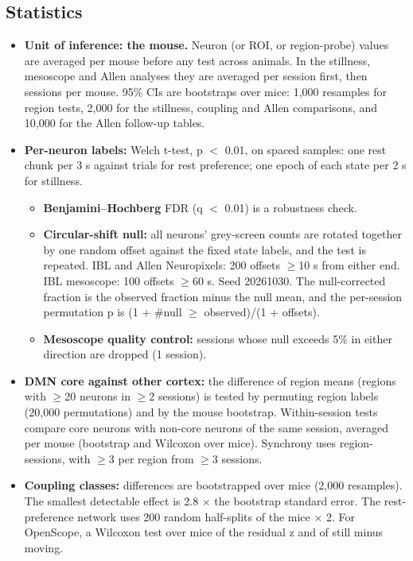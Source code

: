 \documentclass[10pt,a4paper]{article}
\begin{document}
\subsection{Statistics}
\begin{itemize}
\item \textbf{Unit of inference: the mouse.} Neuron (or ROI, or region-probe) values are averaged per mouse before any test across animals. In the stillness, mesoscope and Allen analyses they are averaged per session first, then sessions per mouse. 95\% CIs are bootstraps over mice: 1,000 resamples for region tests, 2,000 for the stillness, coupling and Allen comparisons, and 10,000 for the Allen follow-up tables.
\item \textbf{Per-neuron labels:} Welch t-test, p $<$ 0.01, on spaced samples: one rest chunk per 3 s against trials for rest preference; one epoch of each state per 2 s for stillness. 
\begin{itemize}
\item \textbf{Benjamini--Hochberg} FDR (q $<$ 0.01) is a robustness check.
\item \textbf{Circular-shift null:} all neurons' grey-screen counts are rotated together by one random offset against the fixed state labels, and the test is repeated. IBL and Allen Neuropixels: 200 offsets $\geq$10 s from either end. IBL mesoscope: 100 offsets $\geq$60 s. Seed 20261030. The null-corrected fraction is the observed fraction minus the null mean, and the per-session permutation p is (1 + \#null $\geq$ observed)/(1 + offsets).
\item \textbf{Mesoscope quality control:} sessions whose null exceeds 5\% in either direction are dropped (1 session).
\end{itemize}
\item \textbf{DMN core against other cortex:} the difference of region means (regions with $\geq$20 neurons in $\geq$2 sessions) is tested by permuting region labels (20,000 permutations) and by the mouse bootstrap. Within-session tests compare core neurons with non-core neurons of the same session, averaged per mouse (bootstrap and Wilcoxon over mice). Synchrony uses region-sessions, with $\geq$3 per region from $\geq$3 sessions.
\item \textbf{Coupling classes:} differences are bootstrapped over mice (2,000 resamples). The smallest detectable effect is 2.8 $\times$ the bootstrap standard error. The rest-preference network uses 200 random half-splits of the mice $\times$ 2. For OpenScope, a Wilcoxon test over mice of the residual z and of still minus moving.

\end{itemize}
\end{document}

